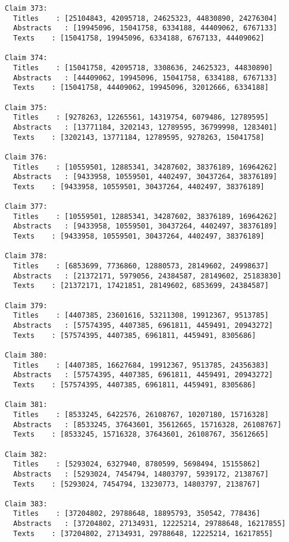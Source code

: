 \documentclass[11pt]{article}
\begin{document}
\begin{Verbatim}[commandchars=\\\{\}]
Claim 373:
  Titles    : [25104843, 42095718, 24625323, 44830890, 24276304]
  Abstracts   : [19945096, 15041758, 6334188, 44409062, 6767133]
  Texts    : [15041758, 19945096, 6334188, 6767133, 44409062]

Claim 374:
  Titles    : [15041758, 42095718, 3308636, 24625323, 44830890]
  Abstracts   : [44409062, 19945096, 15041758, 6334188, 6767133]
  Texts    : [15041758, 44409062, 19945096, 32012666, 6334188]

Claim 375:
  Titles    : [9278263, 12265561, 14319754, 6079486, 12789595]
  Abstracts   : [13771184, 3202143, 12789595, 36799998, 1283401]
  Texts    : [3202143, 13771184, 12789595, 9278263, 15041758]

Claim 376:
  Titles    : [10559501, 12885341, 34287602, 38376189, 16964262]
  Abstracts   : [9433958, 10559501, 4402497, 30437264, 38376189]
  Texts    : [9433958, 10559501, 30437264, 4402497, 38376189]

Claim 377:
  Titles    : [10559501, 12885341, 34287602, 38376189, 16964262]
  Abstracts   : [9433958, 10559501, 30437264, 4402497, 38376189]
  Texts    : [9433958, 10559501, 30437264, 4402497, 38376189]

Claim 378:
  Titles    : [6853699, 7736860, 12880573, 28149602, 24998637]
  Abstracts   : [21372171, 5979056, 24384587, 28149602, 25183830]
  Texts    : [21372171, 17421851, 28149602, 6853699, 24384587]

Claim 379:
  Titles    : [4407385, 23601616, 53211308, 19912367, 9513785]
  Abstracts   : [57574395, 4407385, 6961811, 4459491, 20943272]
  Texts    : [57574395, 4407385, 6961811, 4459491, 8305686]

Claim 380:
  Titles    : [4407385, 16627684, 19912367, 9513785, 24356383]
  Abstracts   : [57574395, 4407385, 6961811, 4459491, 20943272]
  Texts    : [57574395, 4407385, 6961811, 4459491, 8305686]

Claim 381:
  Titles    : [8533245, 6422576, 26108767, 10207180, 15716328]
  Abstracts   : [8533245, 37643601, 35612665, 15716328, 26108767]
  Texts    : [8533245, 15716328, 37643601, 26108767, 35612665]

Claim 382:
  Titles    : [5293024, 6327940, 8780599, 5698494, 15155862]
  Abstracts   : [5293024, 7454794, 14803797, 5939172, 2138767]
  Texts    : [5293024, 7454794, 13230773, 14803797, 2138767]

Claim 383:
  Titles    : [37204802, 29788648, 18895793, 350542, 778436]
  Abstracts   : [37204802, 27134931, 12225214, 29788648, 16217855]
  Texts    : [37204802, 27134931, 29788648, 12225214, 16217855]


\end{Verbatim}
\end{document}
